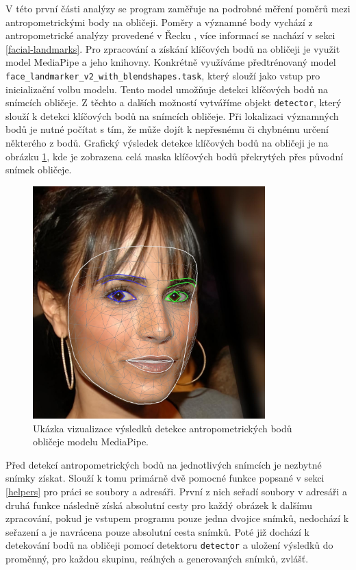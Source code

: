 V této první části analýzy se program zaměřuje na podrobné měření poměrů mezi antropometrickými body na obličeji. Poměry a významné body vychází z antropometrické analýzy provedené v Řecku \cite{Zacharopoulos2016}, více informací se nachází v sekci \ref{facial-landmarks}. Pro zpracování a získání klíčových bodů na obličeji je využit model MediaPipe a jeho knihovny. Konkrétně využíváme předtrénovaný model \texttt{face\_landmarker\_v2\_with\_blendshapes.task}, který slouží jako vstup pro inicializační volbu modelu. Tento model umožňuje detekci klíčových bodů na snímcích obličeje. Z těchto a dalších možností vytváříme objekt \texttt{detector}, který slouží k detekci klíčových bodů na snímcích obličeje. Při lokalizaci významných bodů je nutné počítat s tím, že může dojít k nepřesnému či chybnému určení některého z bodů. Grafický výsledek detekce klíčových bodů na obličeji je na obrázku \ref{fig:facemesh-mediapipe}, kde je zobrazena celá maska klíčových bodů překrytých přes původní snímek obličeje.

\begin{figure}[H]
	\centering
	\includegraphics[width=0.8\textwidth]{obrazky-figures/mediapipe_landmarks.jpg}
	\caption{Ukázka vizualizace výsledků detekce antropometrických bodů obličeje modelu MediaPipe.}
        \label{fig:facemesh-mediapipe}
\end{figure}

Před detekcí antropometrických bodů na jednotlivých snímcích je nezbytné snímky získat. Slouží k tomu primárně dvě pomocné funkce popsané v sekci \ref{helpers} pro práci se soubory a adresáři. První z nich seřadí soubory v adresáři a druhá funkce následně získá absolutní cesty pro každý obrázek k dalšímu zpracování, pokud je vstupem programu pouze jedna dvojice snímků, nedochází k seřazení a je navrácena pouze absolutní cesta snímků. Poté již dochází k detekování bodů na obličeji pomocí detektoru \texttt{detector} a uložení výsledků do proměnný, pro každou skupinu, reálných a generovaných snímků, zvlášť.

